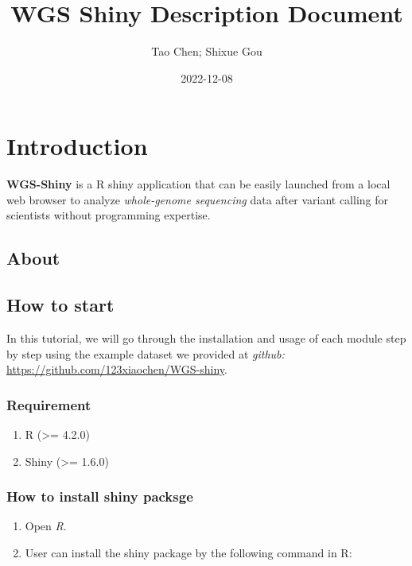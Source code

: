 \documentclass[
]{book}
\title{WGS Shiny Description Document}
\author{Tao Chen; Shixue Gou}
\date{2022-12-08}
\providecommand{\tightlist}{%
  \setlength{\itemsep}{0pt}\setlength{\parskip}{0pt}}
\theoremstyle{definition}
\theoremstyle{definition}
\theoremstyle{definition}
\theoremstyle{definition}
\theoremstyle{remark}
\begin{document}
\maketitle

{
\setcounter{tocdepth}{1}
\tableofcontents
}
\hypertarget{introduction}{%
\chapter{Introduction}\label{introduction}}

\textbf{WGS-Shiny} is a R shiny application that can be easily launched from a local web browser to analyze \emph{whole-genome sequencing} data after variant calling for scientists without programming expertise.

\hypertarget{about}{%
\section{About}\label{about}}

\hypertarget{how-to-start}{%
\section{How to start}\label{how-to-start}}

In this tutorial, we will go through the installation and usage of each module step by step using the example dataset we provided at \emph{github:} \url{https://github.com/123xiaochen/WGS-shiny}.

\hypertarget{requirement}{%
\subsection{Requirement}\label{requirement}}

\begin{enumerate}
\def\labelenumi{\arabic{enumi}.}
\tightlist
\item
  R (\textgreater= 4.2.0)
\item
  Shiny (\textgreater= 1.6.0)
\end{enumerate}

\hypertarget{how-to-install-shiny-packsge}{%
\subsection{How to install shiny packsge}\label{how-to-install-shiny-packsge}}

\begin{enumerate}
\def\labelenumi{\arabic{enumi}.}
\tightlist
\item
  Open \emph{R}.
\item
  User can install the shiny package by the following command in R:
\end{enumerate}
\end{document}
